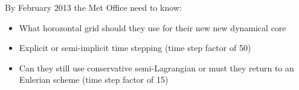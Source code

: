 \begin{slide}{By February 2013 the Met Office need to know:}

\begin{itemize}

\item What horozontal grid should they use for their new new dynamical core

\item Explicit or semi-implicit time stepping (time step factor of 50)

\item Can they still use conservative semi-Lagrangian or must they return to an Eulerian scheme (time step factor of 15)

\end{itemize}

\end{slide}

